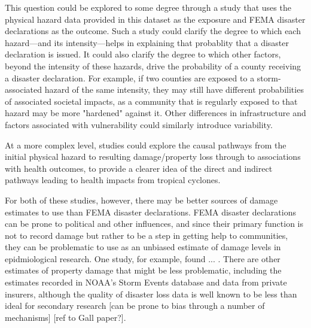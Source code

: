 This question could be explored to some degree through a study that uses the 
physical hazard data provided in this dataset as the exposure and FEMA disaster
declarations as the outcome. Such a study could clarify the degree to which 
each hazard---and its intensity---helps in explaining that probablity that 
a disaster declaration is issued. It could also clarify the degree to which 
other factors, beyond the intensity of these hazards, drive the probability of
a county receiving a disaster declaration. For example, if two counties 
are exposed to a storm-associated hazard of the same intensity, they may 
still have different probabilities of associated societal impacts, as a 
community that is regularly exposed to that hazard may be more "hardened" 
against it. Other differences in infrastructure and factors associated with 
vulnerability could similarly introduce variability. 

At a more complex level, studies could explore the causal pathways from the 
initial physical hazard to resulting damage/property loss through to associations
with health outcomes, to provide a clearer idea of the direct and indirect 
pathways leading to health impacts from tropical cyclones.

For both of these studies, however, there may be better sources of damage
estimates to use than FEMA disaster declarations. FEMA disaster declarations 
can be prone to political and other influences, and since their primary function
is not to record damage but rather to be a step in getting help to communities, 
they can be problematic to use as an unbiased estimate of damage levels in 
epidmiological research. One study, for example, found ... . There are other
estimates of property damage that might be less problematic, including the 
estimates recorded in NOAA's Storm Events database and data from private 
insurers, although the quality of disaster loss data is well known to be
less than ideal for secondary research [can be prone to bias through a number
of mechanisms] [ref to Gall paper?].

